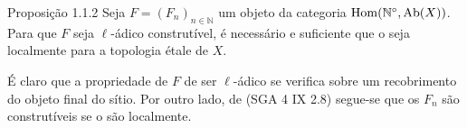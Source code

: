 \begin{statement}{Proposição 1.1.2}
Seja \(F=(F_n)_{n\in\mathbb N}\) um objeto da categoria \(\operatorname{Hom}(\mathbb N^\circ,\operatorname{Ab}(X))\). Para que \(F\) seja \(\ell\)-ádico construtível, é necessário e suficiente que o seja localmente para a topologia étale de \(X\).
\end{statement}

\begin{prooftext}[Demonstração]
É claro que a propriedade de \(F\) de ser \(\ell\)-ádico se verifica sobre um recobrimento do objeto final do sítio. Por outro lado, de (SGA 4 IX 2.8) segue-se que os \(F_n\) são construtíveis se o são localmente.
\end{prooftext}
